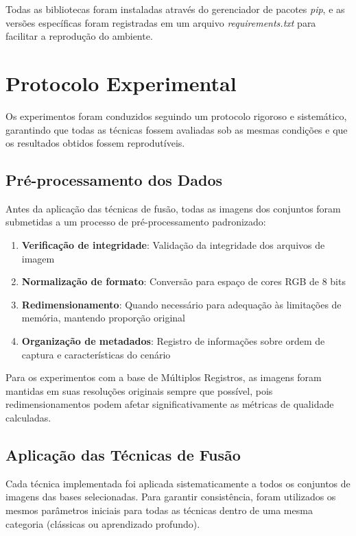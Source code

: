 Todas as bibliotecas foram instaladas através do gerenciador de pacotes \textit{pip}, e as versões específicas foram registradas em um arquivo \textit{requirements.txt} para facilitar a reprodução do ambiente.

\section{Protocolo Experimental}

Os experimentos foram conduzidos seguindo um protocolo rigoroso e sistemático, garantindo que todas as técnicas fossem avaliadas sob as mesmas condições e que os resultados obtidos fossem reprodutíveis.

\subsection{Pré-processamento dos Dados}

Antes da aplicação das técnicas de fusão, todas as imagens dos conjuntos foram submetidas a um processo de pré-processamento padronizado:

\begin{enumerate}
    \item \textbf{Verificação de integridade}: Validação da integridade dos arquivos de imagem
    \item \textbf{Normalização de formato}: Conversão para espaço de cores RGB de 8 bits
    \item \textbf{Redimensionamento}: Quando necessário para adequação às limitações de memória, mantendo proporção original
    \item \textbf{Organização de metadados}: Registro de informações sobre ordem de captura e características do cenário
\end{enumerate}

Para os experimentos com a base de Múltiplos Registros, as imagens foram mantidas em suas resoluções originais sempre que possível, pois redimensionamentos podem afetar significativamente as métricas de qualidade calculadas.

\subsection{Aplicação das Técnicas de Fusão}

Cada técnica implementada foi aplicada sistematicamente a todos os conjuntos de imagens das bases selecionadas. Para garantir consistência, foram utilizados os mesmos parâmetros iniciais para todas as técnicas dentro de uma mesma categoria (clássicas ou aprendizado profundo).

